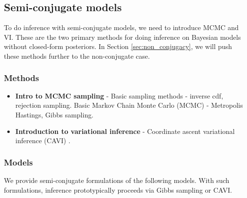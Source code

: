 \documentclass{article} %
\begin{document}
\subsection{Semi-conjugate models} \label{sec:semi_conjugacy}

To do inference with semi-conjugate models, we need to introduce MCMC and VI.  These are the two primary methods for doing inference on Bayesian models without closed-form posteriors. In Section \ref{sec:non_conjugacy}, we will push these methods further to the non-conjugate case.

\subsubsection{Methods}

\begin{itemize}
\item \textbf{Intro to MCMC sampling} - Basic sampling methods - inverse cdf,  rejection sampling. Basic Markov Chain Monte Carlo (MCMC) - Metropolis Hastings, Gibbs sampling.
\item \textbf{Introduction to variational inference} - Coordinate ascent variational inference (CAVI) \cite{wojnowiczXXXXfoundations}.
\end{itemize} 

\subsubsection{Models}
We provide semi-conjugate formulations of the following models.  With such formulations, inference prototypically proceeds via Gibbs sampling or CAVI. 
\end{document}
